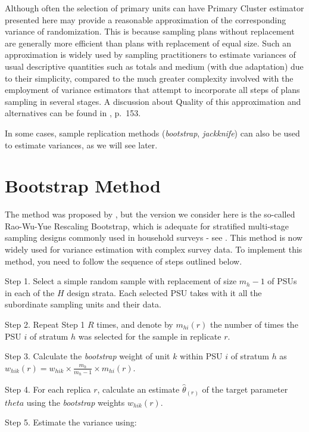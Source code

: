 \documentclass[
  12pt,
]{book}
\begin{document}
Although often the selection of primary units can have Primary Cluster estimator presented here may provide a reasonable approximation of the corresponding variance of randomization. This is because sampling plans without replacement are generally more efficient than plans with replacement of equal size. Such an approximation is widely used by sampling practitioners to estimate variances of usual descriptive quantities such as totals and medium (with due adaptation) due to their simplicity, compared to the much greater complexity involved with the employment of variance estimators that attempt to incorporate all steps of plans sampling in several stages. A discussion about Quality of this approximation and alternatives can be found in \citep{SSW92}, p.~153.

In some cases, sample replication methods (\emph{bootstrap}, \emph{jackknife}) can also be used to estimate variances, as we will see later.

\section{Bootstrap Method}\label{bootstrap-method}

The method was proposed by \citet{Efron1979}, but the version we consider here is the so-called Rao-Wu-Yue Rescaling Bootstrap, which is adequate for stratified multi-stage sampling designs commonly used in household surveys - see \citet{Rao1992}. This method is now widely used for variance estimation with complex survey data. To implement this method, you need to follow the sequence of steps outlined below.

Step 1. Select a simple random sample with replacement of size \(m_h - 1\) of PSUs in each of the \(H\) design strata. Each selected PSU takes with it all the subordinate sampling units and their data.

Step 2. Repeat Step 1 \(R\) times, and denote by \(m_{hi}(r)\) the number of times the PSU \(i\) of stratum \(h\) was selected for the sample in replicate \(r\).

Step 3. Calculate the \emph{bootstrap} weight of unit \(k\) within PSU \(i\) of stratum \(h\) as \(w_{hik} (r) = w_{hik} \times \frac {m_h}{m_h - 1} \times m_{hi}(r)\).

Step 4. For each replica \(r\), calculate an estimate \(\widehat \theta_{(r)}\) of the target parameter \(theta\) using the \emph{bootstrap} weights \(w_{hik} (r)\).

Step 5. Estimate the variance using:
\end{document}
